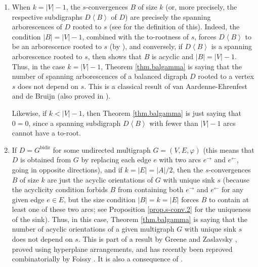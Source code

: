 \documentclass[numbers=enddot,12pt,final,onecolumn,notitlepage]{scrartcl}%
\theoremstyle{definition}
\theoremstyle{plainsl}
\begin{document}
\begin{enumerate}
\item When $k=\left\vert V\right\vert -1$, the $s$-convergences $B$ of size
$k$ (or, more precisely, the respective subdigraphs $D\left\langle
B\right\rangle $ of $D$) are precisely the spanning arborescences of $D$
rooted to $s$ (see \cite[Definition 5.10.1 \textbf{(b)}]{22s} for the
definition of this). Indeed, the condition $\left\vert B\right\vert
=\left\vert V\right\vert -1$, combined with the to-rootness of $s$, forces
$D\left\langle B\right\rangle $ to be an arborescence rooted to $s$ (by
\cite[Theorem 5.10.5]{22s}), and conversely, if $D\left\langle B\right\rangle
$ is a spanning arborescence rooted to $s$, then \cite[Theorem 5.10.5]{22s}
shows that $B$ is acyclic and $\left\vert B\right\vert =\left\vert
V\right\vert -1$. Thus, in the case $k=\left\vert V\right\vert -1$, Theorem
\ref{thm.balgamma} is saying that the number of spanning arborescences of
a balanced digraph $D$ rooted to a vertex $s$ does not depend on $s$.
This is a classical result of van Aardenne-Ehrenfest and de Bruijn
\cite[Theorem 6]{AarBru51} (also proved in \cite[Corollary 5.12.1]{22s}).

Likewise, if $k<\left\vert V\right\vert -1$, then Theorem \ref{thm.balgamma}
is just saying that $0=0$, since a spanning subdigraph $D\left\langle
B\right\rangle $ with fewer than $\left\vert V\right\vert -1$ arcs cannot have
a to-root.

\item If $D=G^{\operatorname*{bidir}}$ for some undirected multigraph
$G=\left(  V,E,\varphi\right)  $ (this means that $D$ is obtained from $G$ by
replacing each edge $e$ with two arcs $e^{\rightarrow}$ and $e^{\leftarrow}$,
going in opposite directions), and if $k=\left\vert E\right\vert =\left\vert
A\right\vert /2$, then the $s$-convergences $B$ of size $k$ are just the
acyclic orientations of $G$ with unique sink $s$ (because the acyclicity
condition forbids $B$ from containing both $e^{\rightarrow}$ and
$e^{\leftarrow}$ for any given edge $e\in E$, but the size condition
$\left\vert B\right\vert =k=\left\vert E\right\vert $ forces $B$ to contain at
least one of these two arcs; see Proposition \ref{prop.s-conv.2} for the
uniqueness of the sink). Thus, in this case, Theorem \ref{thm.balgamma} is
saying that the number of acyclic orientations of a given multigraph $G$ with
unique sink $s$ does not depend on $s$. This is part of a result by Greene and
Zaslavsky \cite[Theorem 7.3]{GreZas83}, proved using hyperplane arrangements,
and has recently been reproved combinatorially by Foissy \cite[Proposition
4.6]{Foissy22}. It is also a consequence of \cite[Proposition 5.3]{NoPoSt02}.


\end{enumerate}
\end{document}
